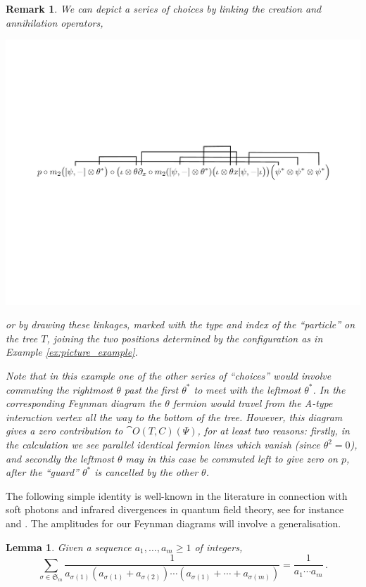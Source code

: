 \documentclass[english,letter paper,12pt,leqno]{article}
\newtheorem{lemma}[theorem]{Lemma}
\theoremstyle{example}
\newtheorem{remark}[theorem]{Remark}
\numberwithin{equation}{section}
\def\be{\begin{equation}}
\def\ee{\end{equation}}
\begin{document}
\begin{remark}
We can depict a series of choices by linking the creation and annihilation operators,
\begin{center}
\includegraphics[scale=0.45]{dia8}
\end{center}
or by drawing these linkages, marked with the type and index of the ``particle'' on the tree $T$, joining the two positions determined by the configuration as in Example \ref{ex:picture_example}.

Note that in this example one of the other series of ``choices'' would involve commuting the rightmost $\theta$ past the first $\theta^*$ to meet with the leftmost $\theta^*$. In the corresponding Feynman diagram the $\theta$ fermion would travel from the A-type interaction vertex all the way to the bottom of the tree. However, this diagram gives a zero contribution to $\cat{O}(T,C)(\Psi)$, for at least two reasons: firstly, in the calculation we see parallel identical fermion lines which vanish (since $\theta^2 = 0$), and secondly the leftmost $\theta$ may in this case be commuted left to give zero on $p$, after the ``guard'' $\theta^*$ is cancelled by the other $\theta$.
\end{remark}

The following simple identity is well-known in the literature in connection with soft photons and infrared divergences in quantum field theory, see for instance \cite[Ch 13]{weinberg} and \cite[p.204]{ps}. The amplitudes for our Feynman diagrams will involve a generalisation.

\begin{lemma} Given a sequence $a_1,\ldots,a_m \ge 1$ of integers,
\be
\sum_{\sigma \in \mathfrak{S}_m} \frac{1}{a_{\sigma(1)}(a_{\sigma(1)} + a_{\sigma(2)}) \cdots (a_{\sigma(1)} + \cdots + a_{\sigma(m)})} = \frac{1}{a_1 \cdots a_m}\,.
\ee
\end{lemma}
\end{document}
